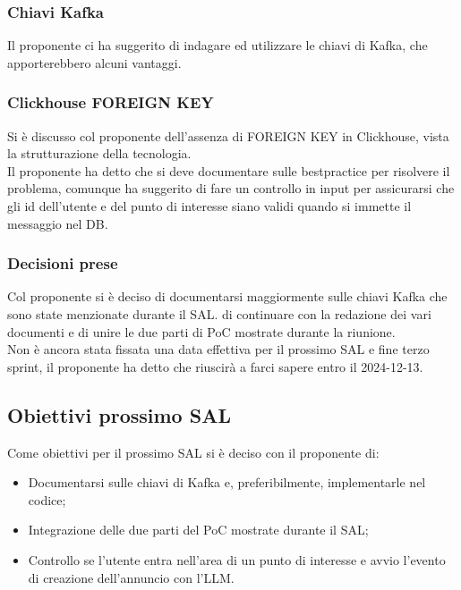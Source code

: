\documentclass[12pt]{article}
\begin{document}
\subsubsection{Chiavi Kafka}
Il proponente ci ha suggerito di indagare ed utilizzare le chiavi di Kafka, che apporterebbero alcuni vantaggi.

\subsubsection{Clickhouse FOREIGN KEY}
Si è discusso col proponente dell'assenza di FOREIGN KEY in Clickhouse, vista la strutturazione della tecnologia.\\
Il proponente ha detto che si deve documentare sulle bestpractice per risolvere il problema, comunque ha suggerito di fare un controllo in input per assicurarsi che gli id dell'utente e del punto di interesse siano validi quando si immette il messaggio nel DB.

\subsubsection{Decisioni prese}
Col proponente si è deciso di documentarsi maggiormente sulle chiavi Kafka che sono state menzionate durante il SAL. di continuare con la redazione dei vari documenti e di unire le due parti di PoC mostrate durante la riunione.\\
Non è ancora stata fissata una data effettiva per il prossimo SAL e fine terzo sprint, il proponente ha detto che riuscirà a farci sapere entro il 2024-12-13.
\newpage
\subsection{Obiettivi prossimo SAL}
Come obiettivi per il prossimo SAL si è deciso con il proponente di:
\begin{itemize}
\item Documentarsi sulle chiavi di Kafka e, preferibilmente, implementarle nel codice;
\item Integrazione delle due parti del PoC mostrate durante il SAL;
  \item Controllo se l'utente entra nell'area di un punto di interesse e avvio l'evento di creazione dell'annuncio con l'LLM.
\end{itemize}
\end{document}
